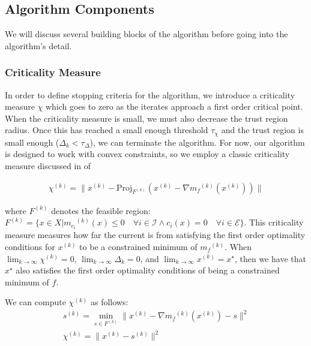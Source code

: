 \documentclass{article}
\theoremstyle{case}
\newcommand{\modelk}{{{m}_f}^{(k)}}
\newcommand{\modelconstrainti}{{{m}_{c_i}}^{(k)}}
\newcommand{\iteratek}{{x}^{(k)}}
\newcommand{\trialk}{{{s}^{(k)}}}
\newcommand{\feasiblek}{{F}^{(k)}}
\newcommand{\chik}{{\chi^{(k)}}}
\begin{document}
\subsection{Algorithm Components}


We will discuss several building blocks of the algorithm before going into the algorithm's detail.

\subsubsection{Criticality Measure}

In order to define stopping criteria for the algorithm, we introduce a criticality measure $\chi$ which goes to zero as the iterates approach a first order critical point.
When the criticality measure is small, we must also decrease the trust region radius.
Once this has reached a small enough threshold $\tau_{\chi}$ and the trust region is small enough ($\Delta_k < \tau_{\Delta}$), we can terminate the algorithm.
For now, our algorithm is designed to work with convex constraints, so we employ a classic criticality measure discussed in \cite{ConnGoulToin00} of

\begin{align}
\chik = \|\iteratek - \text{Proj}_{\feasiblek}(\iteratek- \nabla \modelk(\iteratek))\|
\end{align}

where $\feasiblek$ denotes the feasible region: $\feasiblek = \{x \in X | \modelconstrainti(x) \le 0 \quad \forall i \in \mathcal I \wedge c_i(x) = 0 \quad \forall i \in \mathcal E \}$.
This criticality measure measures how far the current is from satisfying the first order optimality conditions for $\iteratek$ to be a constrained minimum of $\modelk$.
When $ \lim_{k\to\infty} \chik = 0$, $\lim_{k\to\infty}\Delta_k = 0$, and $\lim_{k\to\infty}\iteratek = x^{\star}$, then we have that $x^{\star}$ also satisfies the first order optimality conditions of being a constrained minimum of $f$.


We can compute $\chik$ as follows:
\begin{align}
\label{critical}
\trialk = \min_{s \in \feasiblek} \|\iteratek - \nabla \modelk(\iteratek) - s\|^2 \\
\chik = \|\iteratek - \trialk \|^2
\end{align}
\end{document}

